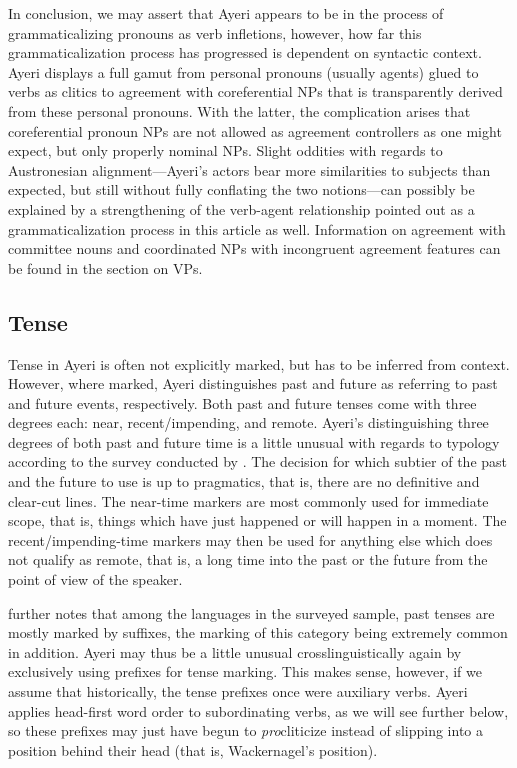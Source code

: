 In conclusion, we may assert that Ayeri appears to be in the process of
grammaticalizing pronouns as verb infletions, however, how far this
grammaticalization process has progressed is dependent on syntactic context.
Ayeri displays a full gamut from personal pronouns (usually agents) glued to
verbs as clitics to agreement with coreferential NPs that is transparently
derived from these personal pronouns. With the latter, the complication arises
that coreferential pronoun NPs are not allowed as agreement controllers as one
might expect, but only properly nominal NPs. Slight oddities with regards to
Austronesian alignment---Ayeri's actors bear more similarities to subjects than
expected, but still without fully conflating the two notions---can possibly be
explained by a strengthening of the verb-agent relationship pointed out as a
grammaticalization process in this article as well. Information on agreement
with committee nouns and coordinated NPs with incongruent agreement features
can be found in the section on VPs.


\subsection{Tense}

Tense in Ayeri is often not explicitly marked, but has to be inferred from
context. However, where marked, Ayeri distinguishes past and future as
referring to past and future events, respectively. Both past and future tenses
come with three degrees each: near, recent/impending, and remote. Ayeri's
distinguishing three degrees of both past and future time is a little unusual
with regards to typology according to the survey conducted by
\citet[127]{dahl1985}. The decision for which subtier of the past and the
future to use is up to pragmatics, that is, there are no definitive and 
clear-cut lines. The near-time markers are most commonly used for immediate 
scope, that is, things which have just happened or will happen in a moment. 
The recent/impending-time markers may then be used for anything else which 
does not qualify as remote, that is, a long time into the past or the future 
from the point of view of the speaker.

\citet[117]{dahl1985} further notes that among the languages in the surveyed
sample, past tenses are mostly marked by suffixes, the marking of this category
being extremely common in addition. Ayeri may thus be a little unusual
crosslinguistically again by exclusively using prefixes for tense marking. This
makes sense, however, if we assume that historically, the tense prefixes once
were auxiliary verbs. Ayeri applies head-first word order to subordinating
verbs, as we will see further below, so these prefixes may just have begun to
\emph{pro}cliticize instead of slipping into a position behind their head (that
is, Wackernagel's position).

